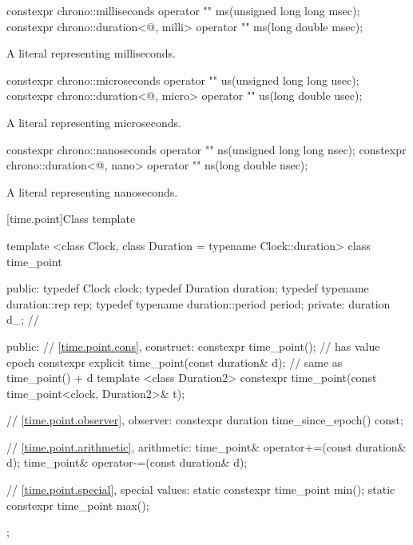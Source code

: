 \begin{itemdecl}
constexpr chrono::milliseconds                  operator "" ms(unsigned long long msec);
constexpr chrono::duration<@\unspec@, milli> operator "" ms(long double msec);
\end{itemdecl}

\begin{itemdescr}
\pnum
\returns
A  literal representing  milliseconds.
\end{itemdescr}

\begin{itemdecl}
constexpr chrono::microseconds                  operator "" us(unsigned long long usec);
constexpr chrono::duration<@\unspec@, micro> operator "" us(long double usec);
\end{itemdecl}

\begin{itemdescr}
\pnum
\returns
A  literal representing  microseconds.
\end{itemdescr}

\begin{itemdecl}
constexpr chrono::nanoseconds                  operator "" ns(unsigned long long nsec);
constexpr chrono::duration<@\unspec@, nano> operator "" ns(long double nsec);
\end{itemdecl}

\begin{itemdescr}
\pnum
\returns
A  literal representing  nanoseconds.
\end{itemdescr}

[time.point]{Class template }

\begin{codeblock}
template <class Clock, class Duration = typename Clock::duration>
class time_point {
public:
  typedef Clock                     clock;
  typedef Duration                  duration;
  typedef typename duration::rep    rep;
  typedef typename duration::period period;
private:
  duration d_;  // \expos

public:
  // \ref{time.point.cons}, construct:
  constexpr time_point();  // has value epoch
  constexpr explicit time_point(const duration& d);  // same as time_point() + d
  template <class Duration2>
    constexpr time_point(const time_point<clock, Duration2>& t);

  // \ref{time.point.observer}, observer:
  constexpr duration time_since_epoch() const;

  // \ref{time.point.arithmetic}, arithmetic:
  time_point& operator+=(const duration& d);
  time_point& operator-=(const duration& d);

  // \ref{time.point.special}, special values:
  static constexpr time_point min();
  static constexpr time_point max();
};
\end{codeblock}

